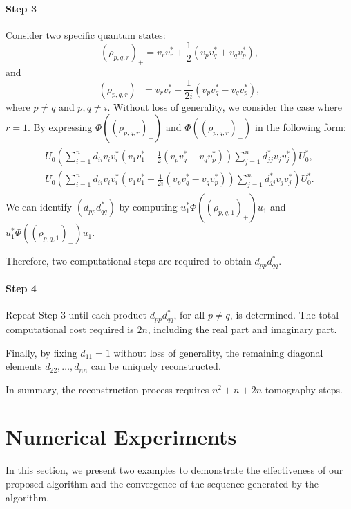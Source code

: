\documentclass[sn-mathphys-num]{sn-jnl}%
\theoremstyle{thmstyleone}%
\theoremstyle{thmstyletwo}%
\theoremstyle{thmstylethree}%
\begin{document}
\paragraph{Step 3}
Consider two specific quantum states:  
\[
\left(\rho_{p,q,r}\right)_+ = v_r v_r^* + \dfrac{1}{2}(v_p v_q^* + v_q v_p^*),
\]
and  
\[
\left(\rho_{p,q,r}\right)_- = v_r v_r  ^* + \frac{1}{2i} (v_p v_q^* - v_q v_p^*),
\]
where $p \neq q$ and $p, q \neq i$.
%
%
%
Without loss of generality, we consider the case where $r = 1$. By expressing $\Phi\left(\left(\rho_{p,q,r}\right)_+\right)$ and $ \Phi\left(\left(\rho_{p,q,r}\right)_-\right)$ in the following form:  
%
\begin{align*}
\begin{array}{l}
     U_0\left(\sum_{i=1}^n d_{ii} v_i v_i^* \left(v_1 v_1^* +\frac{1}{2} (v_p v_q^* + v_q v_p^*)\right) \sum_{j=1}^n d_{jj}^* v_j v_j^*\right)  U_0^*,\\
     U_0\left(\sum_{i=1}^n d_{ii} v_i v_i^* \left(v_1 v_1^* + \frac{1}{2i} (v_p v_q^* - v_q v_p^*)\right) \sum_{j=1}^n d_{jj}^* v_j v_j^*\right)  U_0^*.
\end{array}
\end{align*}
%
We can identify $(d_{pp}d_{qq}^*)$ by computing $u_1^*\Phi\left(\left(\rho_{p,q,1}\right)_+\right)u_1$ and $u_1^*\Phi\left(\left(\rho_{p,q,1}\right)_-\right)u_1$. {Therefore, two computational steps are required to obtain $d_{pp}d_{qq}^*$.


\paragraph{Step 4}
Repeat Step 3 until each product $d_{pp}d_{qq}^*$, for all $p \neq q$, is determined. The total computational cost required is  $2n$, including the real part and imaginary part.} Finally, by fixing $d_{11} = 1$ without loss of generality, the remaining diagonal elements $d_{22}, \dots, d_{nn}$ can be uniquely reconstructed.

In summary, the reconstruction process requires $n^2+n+2n$ tomography steps.


\section{Numerical Experiments}
In this section, we present two examples to demonstrate the effectiveness of our proposed algorithm and the convergence of the sequence generated by the algorithm.
\end{document}
